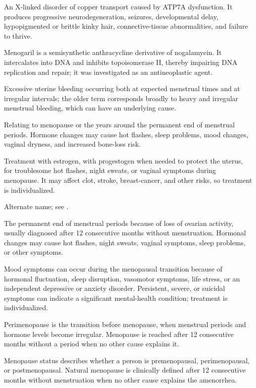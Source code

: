  An X-linked disorder of copper transport caused by ATP7A dysfunction. It produces
progressive neurodegeneration, seizures, developmental delay, hypopigmented or brittle
kinky hair, connective-tissue abnormalities, and failure to thrive.

 Menogaril is a semisynthetic anthracycline derivative of nogalamycin. It intercalates into DNA and inhibits topoisomerase II, thereby impairing DNA replication and repair; it was investigated as an antineoplastic agent.

 Excessive uterine bleeding occurring both at expected menstrual times and at irregular intervals; the older term corresponds broadly to heavy and irregular menstrual bleeding, which can have an underlying cause.

 Relating to menopause or the years around the permanent end of menstrual periods. Hormone changes may cause hot flashes, sleep problems, mood changes, vaginal dryness, and increased bone-loss risk.

 Treatment with estrogen, with progestogen when needed to protect the uterus, for troublesome hot flashes, night sweats, or vaginal symptoms during menopause. It may affect clot, stroke, breast-cancer, and other risks, so treatment is individualized.

 Alternate name; see .

 The permanent end of menstrual periods because of loss of ovarian activity, usually diagnosed after 12 consecutive months without menstruation. Hormonal changes may cause hot flashes, night sweats, vaginal symptoms, sleep problems, or other symptoms.

 Mood symptoms can occur during the menopausal transition because of hormonal fluctuation, sleep disruption, vasomotor symptoms, life stress, or an independent depressive or anxiety disorder. Persistent, severe, or suicidal symptoms can indicate a significant mental-health condition; treatment is individualized.

 Perimenopause is the transition before menopause, when menstrual periods and hormone levels become irregular. Menopause is reached after 12 consecutive months without a period when no other cause explains it.

 Menopause status describes whether a person is premenopausal, perimenopausal, or postmenopausal. Natural menopause is clinically defined after 12 consecutive months without menstruation when no other cause explains the amenorrhea.

